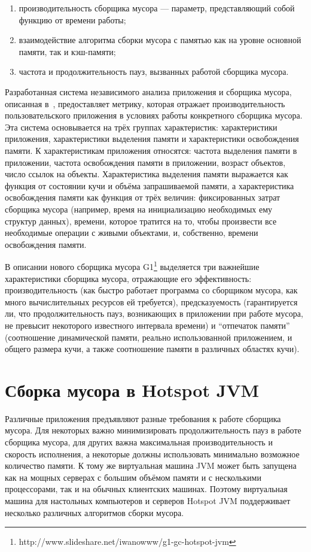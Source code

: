 \begin{enumerate}
\item производительность сборщика мусора --- параметр, представляющий собой функцию от
времени работы;
\item взаимодействие алгоритма сборки мусора с памятью как на уровне основной памяти, так и кэш-памяти;
\item частота и продолжительность пауз, вызванных работой сборщика мусора.
\end{enumerate}

Разработанная система независимого анализа приложения и сборщика мусора,
описанная в~\cite{book:HBench}, предоставляет метрику, которая отражает производительность
пользовательского приложения в условиях работы конкретного сборщика мусора. Эта система
основывается на трёх группах характеристик: характеристики приложения, характеристики 
выделения памяти и характеристики освобождения памяти. К характеристикам приложения
относятся: частота выделения памяти в приложении, частота освобождения памяти в приложении,
возраст объектов, число ссылок на объекты. Характеристика выделения памяти выражается
как функция от состоянии кучи и объёма запрашиваемой памяти, а характеристика освобождения
памяти как функция от трёх величин: фиксированных затрат сборщика мусора (например,
время на инициализацию необходимых ему структур данных), времени, которое тратится
на то, чтобы произвести все необходимые операции с живыми объектами, и, собственно,
времени освобождения памяти.

В описании нового сборщика мусора G1\footnote{http://www.slideshare.net/iwanowww/g1-gc-hotspot-jvm}
выделяется три важнейшие характеристики сборщика мусора, отражающие его эффективность:
производительность (как быстро работает программа со сборщиком мусора, как много
вычислительных ресурсов ей требуется), предсказуемость (гарантируется ли, что продолжительность 
пауз, возникающих в приложении при работе мусора, не превысит некоторого известного
интервала времени) и ``отпечаток памяти'' (соотношение динамической памяти, реально
использованной приложением, и общего размера кучи, а также соотношение памяти в различных 
областях кучи).

\section {Сборка мусора в Hotspot JVM}

Различные приложения предъявляют разные требования к работе сборщика мусора. Для некоторых важно минимизировать
продолжительность пауз в работе сборщика мусора, для других важна максимальная 
производительность и скорость исполнения, а некоторые должны использовать минимально
возможное количество памяти. К тому же виртуальная машина JVM может быть запущена
как на мощных серверах с большим объёмом памяти и с несколькими процессорами, так и на 
обычных клиентских машинах. Поэтому виртуальная машина для настольных компьютеров и серверов
Hotspot JVM поддерживает несколько различных алгоритмов сборки
мусора.

